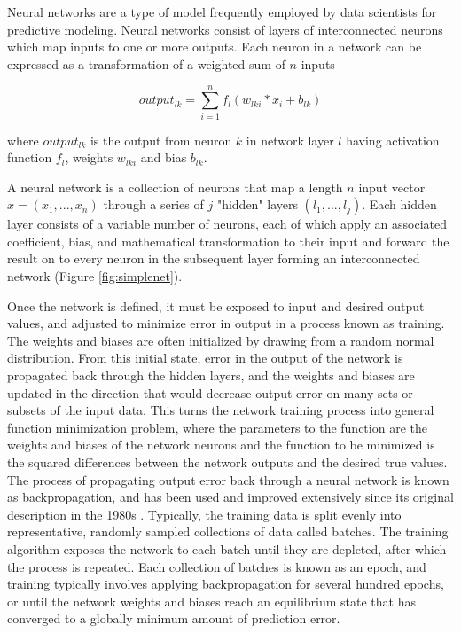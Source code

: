 Neural networks are a type of model frequently employed by data scientists
for predictive modeling. Neural networks consist of layers of interconnected neurons
which map inputs to one or more outputs. Each neuron in a network can be expressed as a 
transformation of a weighted sum of $n$ inputs 

\begin{equation}
output_{lk} = \sum_{i=1}^{n} f_l(w_{lki} * x_{i} + b_{lk})
\label{eq:neuron}
\end{equation}

where $output_{lk}$ is the output from neuron $k$ in network layer $l$ having activation
function $f_l$, weights $w_{lki}$ and bias $b_{lk}$.

A neural network is a collection of neurons that map a 
length $n$ input vector $x = (x_1, ..., x_n)$ through a series of $j$ 
"hidden" layers $(l_1, ..., l_j)$. Each hidden layer consists of a variable 
number of neurons, each of which apply an associated coefficient, bias, and 
mathematical transformation to their input and forward the 
result on to every neuron in the subsequent layer forming an interconnected 
network (Figure \ref{fig:simplenet}).

\ifdefined\showtablesandfigures
\fi


Once the network is defined, it must be exposed to input and desired output
values, and adjusted to minimize error in output in a process known as training.
The weights and biases are often initialized by drawing from a
random normal distribution. From this initial state, error in 
the output of the network is propagated back through the hidden 
layers, and the weights and biases are updated in the direction that would 
decrease output error on many sets or subsets of the input data. 
This turns the network training process into general 
function minimization problem, where the parameters to the function are the 
weights and biases of the network neurons and the function to be 
minimized is the squared differences between the network outputs and 
the desired true values. The process of propagating output error back 
through a neural network is known as backpropagation, and has been used 
and improved extensively since its original description in the 
1980s \citep{rumelhart1986}.  Typically, the training data is split 
evenly into representative, randomly sampled collections of data 
called batches. The training algorithm exposes the network to each 
batch until they are depleted, after which the process is repeated. Each 
collection of batches is known as an epoch, and training typically 
involves applying backpropagation for several hundred epochs, or until the network
weights and biases reach an equilibrium state that has converged to a 
globally minimum amount of prediction error.

